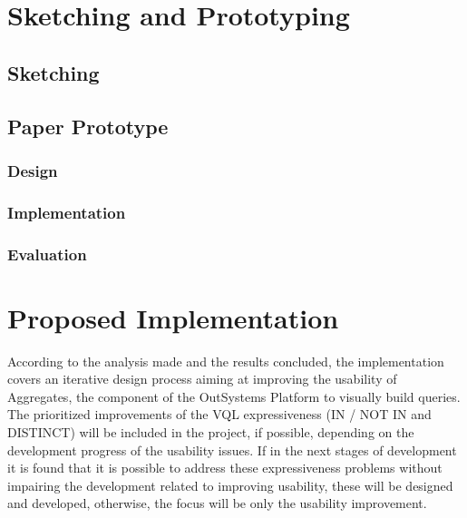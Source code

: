\section{Sketching and Prototyping}
\label{sec:sketching_and_prototyping}

\subsection{Sketching}
\label{subsec:sketching}

\subsection{Paper Prototype}
\label{subsec:paper_prototype}

\subsubsection{Design}
\label{subsubsec:paper_prototype_design}

\subsubsection{Implementation}
\label{subsubsec:paper_prototype_implementation}

\subsubsection{Evaluation}
\label{subsubsec:paper_prototype_evaluation}



\clearpage


\section{Proposed Implementation}
\label{sec:proposed_implementation}
According to the analysis made and the results concluded, the implementation covers an iterative design process aiming at improving the usability of Aggregates, the component of the OutSystems Platform to visually build queries. The prioritized improvements of the \gls{VQL} expressiveness (IN / NOT IN and DISTINCT) will be included in the project, if possible, depending on the development progress of the usability issues. If in the next stages of development it is found that it is possible to address these expressiveness problems without impairing the development related to improving usability, these will be designed and developed, otherwise, the focus will be only the usability improvement. %


